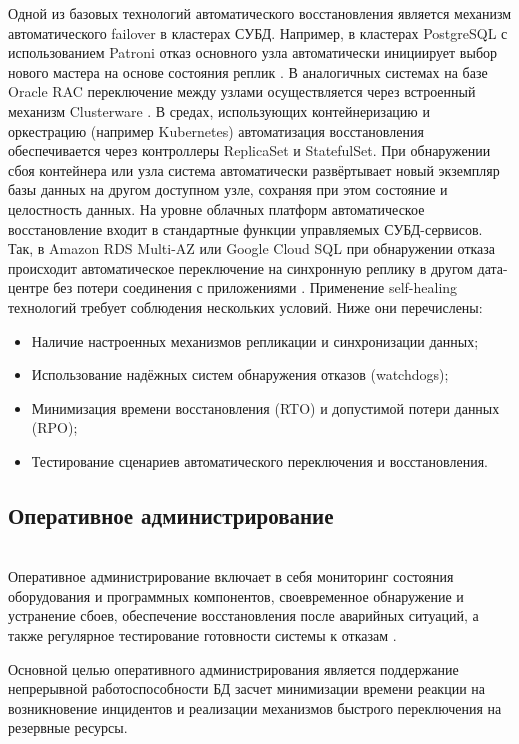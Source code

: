 Одной из базовых технологий автоматического восстановления является механизм автоматического failover в кластерах СУБД. Например, в кластерах PostgreSQL с использованием Patroni отказ основного узла автоматически инициирует выбор нового мастера на основе состояния реплик \autocite{Kleppmann}. В аналогичных системах на базе Oracle RAC переключение между узлами осуществляется через встроенный механизм Clusterware \autocite{OracleRAC}.
В средах, использующих контейнеризацию и оркестрацию (например Kubernetes) автоматизация восстановления обеспечивается через контроллеры ReplicaSet и StatefulSet. При обнаружении сбоя контейнера или узла система автоматически развёртывает новый экземпляр базы данных на другом доступном узле, сохраняя при этом состояние и целостность данных.
На уровне облачных платформ автоматическое восстановление входит в стандартные функции управляемых СУБД-сервисов. Так, в Amazon RDS Multi-AZ или Google Cloud SQL при обнаружении отказа происходит автоматическое переключение на синхронную реплику в другом дата-центре без потери соединения с приложениями \autocite{AmazonRds2}.
Применение self-healing технологий требует соблюдения нескольких условий. Ниже они перечислены:
\begin{itemize}
    \item Наличие настроенных механизмов репликации и синхронизации данных;
    \item Использование надёжных систем обнаружения отказов (watchdogs);
    \item Минимизация времени восстановления (RTO) и допустимой потери данных (RPO);
    \item Тестирование сценариев автоматического переключения и восстановления.
\end{itemize}


\subsection{Оперативное администрирование} ~\\

Оперативное администрирование включает в себя мониторинг состояния оборудования и программных компонентов, своевременное обнаружение и устранение сбоев, обеспечение восстановления после аварийных ситуаций, а также регулярное тестирование готовности системы к отказам \autocites{SameerParadkar}{heycoachHAA}.

Основной целью оперативного администрирования является поддержание непрерывной работоспособности БД засчет минимизации времени реакции на возникновение инцидентов и реализации механизмов быстрого переключения на резервные ресурсы.

